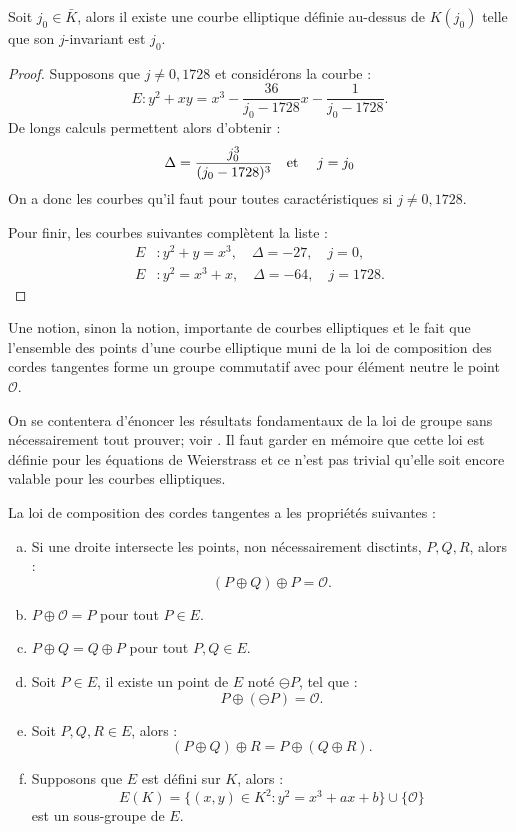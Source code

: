 \documentclass[a4paper]{article} %
\numberwithin{section}{part}
\numberwithin{equation}{section}
\newcommand\EO{\mathcal{O}}
\newcommand\etmath{\textup{\quad et \quad}}
\begin{document}
\begin{prop}
Soit $j_0\in\bar{K}$, alors il existe une courbe elliptique définie au-dessus de
$K(j_0)$ telle que son $j$-invariant est $j_0$.
\end{prop}
\begin{proof}
Supposons que $j \neq 0, 1728$ et considérons la courbe :
\[E : y^2 + xy = x^3 - \frac{36}{j_0 - 1728}x - \frac{1}{j_0 - 1728}.\]
De longs calculs permettent alors d'obtenir :
\[\Delta = \frac{j_0^3}{(j_0 - 1728)^3} \etmath j = j_0\]
On a donc les courbes qu'il faut pour toutes caractéristiques si $j \neq 0,
1728$.\par
Pour finir, les courbes suivantes complètent la liste :
\begin{align*}
E &: y^2 + y = x^3, \quad \Delta = -27, \quad j = 0,\\
E &: y^2 = x^3 + x, \quad \Delta = -64, \quad j= 1728.
\end{align*}
\end{proof}

Une notion, sinon la notion, importante de courbes elliptiques et le fait que
l'ensemble des points d'une courbe elliptique muni de la loi de composition des
cordes tangentes forme un groupe commutatif avec pour élément neutre le point 
$\EO$.\par
On se contentera d'énoncer les résultats fondamentaux de la loi de groupe sans 
nécessairement tout prouver; voir \cite[Chap.~III, p~51-53]{Sil}. Il faut garder
en mémoire que cette loi est définie pour les équations de Weierstrass et ce 
n'est pas trivial qu'elle soit encore valable pour les courbes elliptiques. 

\begin{prop}
La loi de composition des cordes tangentes a les propriétés suivantes :
\begin{enumerate}[(a)]
\item Si une droite intersecte les points, non nécessairement disctints, $P, Q,
R$, alors :
\[(P\oplus Q) \oplus P = \EO.\]

\item $P\oplus\EO=P$ pour tout $P\in E$.

\item $P\oplus Q = Q \oplus P$ pour tout $P, Q\in E$.

\item Soit $P\in E$, il existe un point de $E$ noté $\ominus P$, tel que :
\[P\oplus(\ominus P) = \EO.\]

\item Soit $P, Q, R \in E$, alors :
\[(P\oplus Q) \oplus R = P\oplus (Q\oplus R).\]

\item Supposons que $E$ est défini sur $K$, alors :
\[E(K) = \lbrace{(x,y)\in K^2 : y^2 = x^3 + ax +
b}\rbrace\cup\lbrace{\EO}\rbrace\]
est un sous-groupe de $E$.
\end{enumerate}
\end{prop}
\end{document}
